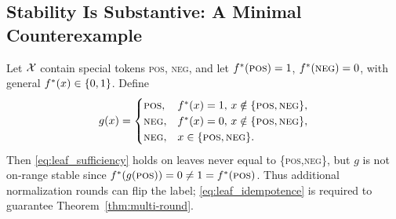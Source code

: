 \subsection{Stability Is Substantive: A Minimal Counterexample}
\label{app:stability}

Let $\mathcal{X}$ contain special tokens \textsc{pos}, \textsc{neg}, and let $f^{\ast}(\textsc{pos})=1$, $f^{\ast}(\textsc{neg})=0$, with general $f^{\ast}(x)\in\{0,1\}$. Define
\[
g(x)=
\begin{cases}
\textsc{pos},& f^{\ast}(x)=1,\,x\notin\{\textsc{pos},\textsc{neg}\},\\
\textsc{neg},& f^{\ast}(x)=0,\,x\notin\{\textsc{pos},\textsc{neg}\},\\
\textsc{neg},& x\in\{\textsc{pos},\textsc{neg}\}.
\end{cases}
\]
Then \ref{eq:leaf_sufficiency} holds on leaves never equal to \{\textsc{pos},\textsc{neg}\}, but $g$ is not on‑range stable since $f^{\ast}(g(\textsc{pos}))=0\neq 1=f^{\ast}(\textsc{pos})$. Thus additional normalization rounds can flip the label; \ref{eq:leaf_idempotence} is required to guarantee Theorem~\ref{thm:multi-round}.
